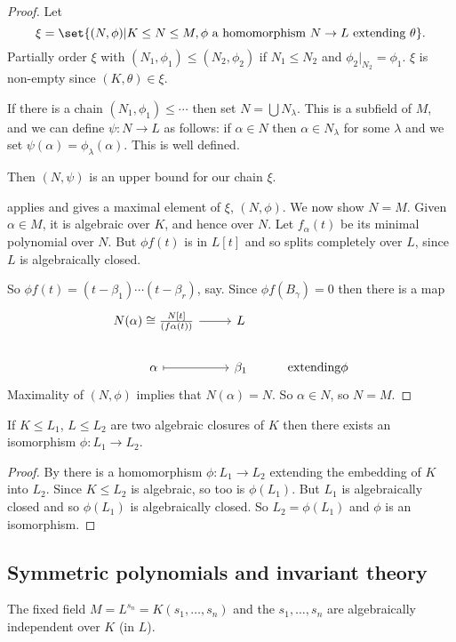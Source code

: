 \documentclass{article}
\begin{document}
\begin{proof}
    Let
    \begin{equation*}
        \xi = \set{(N, \phi) | K \leq N \leq M, \phi \text{ a homomorphism } N \to L \text{ extending } \theta}.
    \end{equation*}
    Partially order $\xi$ with $(N_1, \phi_1) \leq (N_2, \phi_2)$ if $N_1 \leq N_2$ and $\phi_2|_{N_2} = \phi_1$.
    $\xi$ is non-empty since $(K, \theta) \in \xi$.

    If there is a chain $(N_1, \phi_1) \leq \dotsb$
    then set $N = \bigcup N_\lambda$. This is a subfield of $M$, and we can define $\psi: N \to L$ as follows:
    if $\alpha \in N$ then $\alpha \in N_\lambda$ for some $\lambda$ and we set $\psi(\alpha) = \phi_\lambda(\alpha)$. This is well defined.

    Then $(N,\psi)$ is an upper bound for our chain $\xi$.

     applies and gives a maximal element of $\xi$, $(N, \phi)$.
    We now show $N=M$.
    Given $\alpha \in M$, it is algebraic over $K$, and hence over $N$.
    Let $f_\alpha(t)$ be its minimal polynomial over $N$.
    But $\phi f(t)$ is in $L[t]$ and so splits completely over $L$, since $L$ is algebraically closed.

    So $\phi f(t) = (t-\beta_1)\dotsm(t-\beta_r)$, say.
    Since $\phi f(B_\gamma) = 0$ then there is a map
    \begin{equation*}
        \begin{tikzcd}
            N(\alpha) \cong \frac{N[t]}{(f\alpha(t))} \rar & L \\
            \alpha \rar[maps to] & \beta_1 & \text{extending} \phi
        \end{tikzcd}
    \end{equation*}
    Maximality of $(N,\phi)$ implies that $N(\alpha) = N$. So $\alpha \in N$, so $N = M$.
\end{proof}
\begin{nthm}\label{thm:5.9}
    If $K \leq L_1$, $L \leq L_2$ are two algebraic closures of $K$ then there exists an isomorphism $\phi:L_1 \to L_2$.
\end{nthm}
\begin{proof}
    By  there is a homomorphism $\phi:L_1 \to L_2$ extending the embedding of $K$ into $L_2$.
    Since $K \leq L_2$ is algebraic, so too is $\phi(L_1)$. But $L_1$ is algebraically closed and so $\phi(L_1)$ is algebraically closed.
    So $L_2 = \phi(L_1)$ and $\phi$ is an isomorphism.
\end{proof}
\subsection{Symmetric polynomials and invariant theory}


















\begin{nthm}\label{thm:5.11}
    The fixed field $M = L^{s_n} = K(s_1, \dotsc, s_n)$ and the $s_1, \dotsc, s_n$ are algebraically independent over $K$ (in $L$).
\end{nthm}
\end{document}
